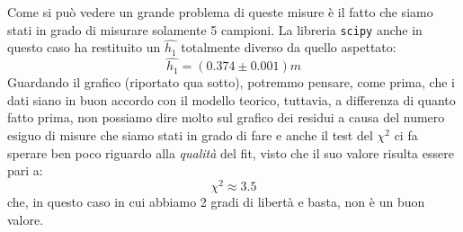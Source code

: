\documentclass{article}
\begin{document}
Come si può vedere un grande problema di queste misure è il fatto che siamo stati in grado di misurare solamente 5 campioni. La libreria \texttt{scipy} anche in questo caso ha restituito un $\hat{h_1}$ totalmente diverso da quello aspettato:
\begin{equation}
	\hat{h_1} = (0.374 \pm 0.001) \unit{m}
\end{equation}
Guardando il grafico (riportato qua sotto), potremmo pensare, come prima, che i dati siano in buon accordo con il modello teorico, tuttavia, a differenza di quanto fatto prima, non possiamo dire molto  sul grafico dei residui a causa del numero esiguo di misure che siamo stati in grado di fare e anche il test del $\chi^2$ ci fa sperare ben poco riguardo alla \emph{qualità} del fit, visto che il suo valore risulta essere pari a:
\begin{equation}
	\chi^2 \approx 3.5
\end{equation}
che, in questo caso in cui abbiamo 2 gradi di libertà e basta, non è un buon valore.
\\
\end{document}
